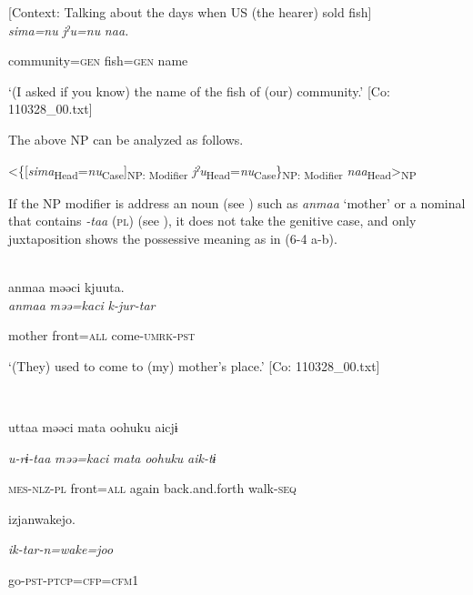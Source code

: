 \ea\label{ex:6-2}
   [Context: Talking about the days when US (the hearer) sold fish]\\

{\TM}
\gll \textit{sima=nu}  \textit{jˀu=nu}  \textit{naa.}

    community=\textsc{gen}  fish=\textsc{gen}  name

\glt    ‘(I asked if you know) the name of the fish of (our) community.’ [Co: 110328\_00.txt]
\z

The above NP can be analyzed as follows.

\ea\label{ex:6-3}
 <\{[\textit{sima}\textsubscript{Head}=\textit{nu}\textsubscript{Case}]\textsubscript{NP: Modifier} \textit{jˀu}\textsubscript{Head}=\textit{nu}\textsubscript{Case}\}\textsubscript{NP: Modifier} \textit{naa}\textsubscript{Head}>\textsubscript{NP}
\z


If the NP modifier is address an noun (see ) such as \textit{anmaa} ‘mother’ or a nominal that contains \textit{{}-taa} (\textsc{pl}) (see ), it does not take the genitive case, and only juxtaposition shows the possessive meaning as in (6-4 a-b).

\ea\label{ex:6-4}
\ea{}\\
\gll  {\TM}  anmaa  məəci  kjuuta.\\

      \textit{anmaa}  \textit{məə=kaci}  \textit{k-jur-tar}

      mother  front=\textsc{all}  come-\textsc{umrk}-\textsc{pst}

\glt ‘(They) used to come to (my) mother’s place.’ [Co: 110328\_00.txt]

 \ex{}\\
\gll

{\US}
uttaa  məəci  mata  {\textbar}oohuku{\textbar}  aicjɨ

      \textit{u-rɨ-taa}  \textit{məə=kaci}  \textit{mata}  \textit{oohuku}  \textit{aik-tɨ}

      \textsc{mes}-\textsc{nlz}-\textsc{pl}  front=\textsc{all}  again  back.and.forth  walk-\textsc{seq}

      izjanwakejo.

      \textit{ik-tar-n=wake=joo}

      go-\textsc{pst}-\textsc{ptcp}=\textsc{cfp}=\textsc{cfm}1

